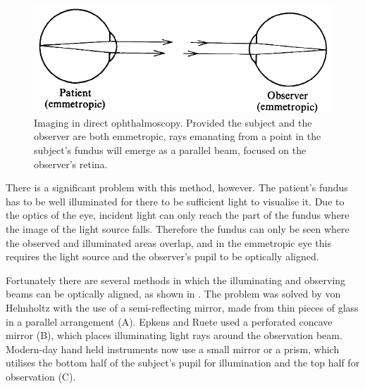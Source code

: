 \begin{figure}[htbp]
\centering
  \includegraphics{figures/direct_opthalmoscopy}
\caption{Imaging in direct ophthalmoscopy. Provided the subject and the observer are both emmetropic, rays emanating from a point in the subject's fundus will emerge as a parallel beam, focused on the observer's retina.\cite{colenbrander2013principles}}
\label{fig:direct_opthal}
\end{figure}


There is a significant problem with this method, however.  The patient's fundus has to be well illuminated for there to be sufficient light to visualise it.  Due to the optics of the eye, incident light can only reach the part of the fundus where the image of the light source falls.  Therefore the fundus can only be seen where the observed and illuminated areas overlap, and in the emmetropic eye this requires the light source and the observer's pupil to be optically aligned.

Fortunately there are several methods in which the illuminating and observing beams can be optically aligned, as shown in .  The problem was solved by von Helmholtz with the use of a semi-reflecting mirror, made from thin pieces of glass in a parallel arrangement (A).  Epkens and Ruete used a perforated concave mirror (B), which places illuminating light rays around the observation beam.  Modern-day hand held instruments now use a small mirror or a prism, which utilises the bottom half of the subject's pupil for illumination and the top half for observation (C).



